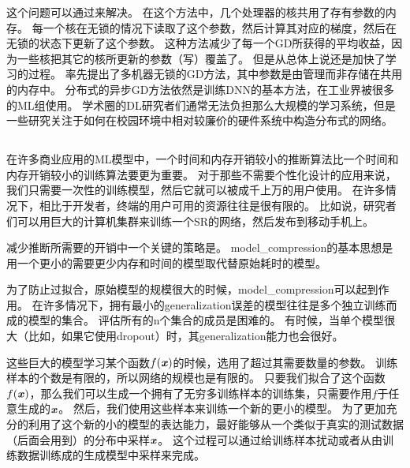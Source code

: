 这个问题可以通过\citep{Bengio+Bengio96,Recht-et-al-NIPS2011}来解决。
在这个方法中，几个处理器的核共用了存有参数的内存。
每一个核在无锁的情况下读取了这个参数，然后计算其对应的梯度，然后在无锁的状态下更新了这个参数。
这种方法减少了每一个\gls{GD}所获得的平均收益，因为一些核把其它的核所更新的参数（写）覆盖了。
但是从总体上说还是加快了学习的过程。
\citet{Dean-et-al-NIPS2012}率先提出了多机器无锁的\gls{GD}方法，其中参数是由管理而非存储在共用的内存中。
分布式的异步\gls{GD}方法依然是训练\gls{DNN}的基本方法，在工业界被很多的\gls{ML}组使用\citep{chilimbi2014project,Wu-et-al-arXiv2015}。
学术圈的\gls{DL}研究者们通常无法负担那么大规模的学习系统，但是一些研究关注于如何在校园环境中相对较廉价的硬件系统中构造分布式的网络\citep{icml2013_coates13}。


\subsection{}
\label{sec:model_compression}

在许多商业应用的\gls{ML}模型中，一个时间和内存开销较小的推断算法比一个时间和内存开销较小的训练算法要更为重要。
对于那些不需要个性化设计的应用来说，我们只需要一次性的训练模型，然后它就可以被成千上万的用户使用。
在许多情况下，相比于开发者，终端的用户可用的资源往往是很有限的。
比如说，研究者们可以用巨大的计算机集群来训练一个\gls{SR}的网络，然后发布到移动手机上。


减少推断所需要的开销中一个关键的策略是\citep{bucilua2006model}。
\gls{model_compression}的基本思想是用一个更小的需要更少内存和时间的模型取代替原始耗时的模型。



为了防止过拟合，原始模型的规模很大的时候，\gls{model_compression}可以起到作用。
在许多情况下，拥有最小的\gls{generalization}误差的模型往往是多个独立训练而成的模型的集合。
评估所有的n个集合的成员是困难的。
有时候，当单个模型很大（比如，如果它使用\gls{dropout}）时，其\gls{generalization}能力也会很好。

这些巨大的模型学习某个函数$f(\boldsymbol{\mathit{x}})$的时候，选用了超过其需要数量的参数。
训练样本的个数是有限的，所以网络的规模也是有限的。
只要我们拟合了这个函数$f(\boldsymbol{\mathit{x}})$，那么我们可以生成一个拥有了无穷多训练样本的训练集，只需要作用$f$于任意生成的$\boldsymbol{\mathit{x}}$。
然后，我们使用这些样本来训练一个新的更小的模型。
为了更加充分的利用了这个新的小的模型的表达能力，最好能够从一个类似于真实的测试数据（后面会用到）的分布中采样$\boldsymbol{\mathit{x}}$。
这个过程可以通过给训练样本扰动或者从由训练数据训练成的生成模型中采样来完成。

